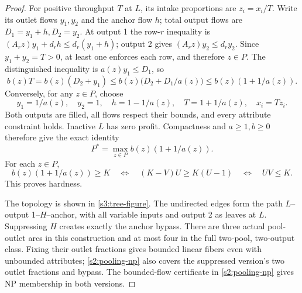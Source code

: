 \begin{proof}
For positive throughput $T$ at $L$, its intake proportions are $z_i=x_i/T$.
Write its outlet flows $y_1,y_2$ and the anchor flow $h$; total output
flows are $D_1=y_1+h,D_2=y_2$. At output 1 the row-$r$ inequality is
$(A_rz)y_1+d_rh\le d_r(y_1+h)$; output 2 gives
$(A_rz)y_2\le d_ry_2$. Since $y_1+y_2=T>0$, at least one enforces
each row, and therefore $z\in P$. The distinguished inequality is
$a(z)y_1\le D_1$, so
\[
 b(z)T=b(z)(D_2+y_1)
 \le b(z)\bigl(D_2+D_1/a(z)\bigr)
 \le b(z)(1+1/a(z)).
\]
Conversely, for any $z\in P$, choose
\begin{equation}
 y_1=1/a(z),\quad y_2=1,\quad h=1-1/a(z),\quad
 T=1+1/a(z),\quad x_i=Tz_i.\label{s3:radial-max}
\end{equation}
Both outputs are filled, all flows respect their bounds, and every
attribute constraint holds. Inactive $L$ has zero profit. Compactness
and $a\ge1,b\ge0$ therefore give the exact identity
\begin{equation}
 P^*=\max_{z\in P}b(z)(1+1/a(z)).\label{s3:two-pool-value}
\end{equation}
For each $z\in P$,
\begin{equation}
 b(z)(1+1/a(z))\ge K
 \quad\Longleftrightarrow\quad
 (K-V)U\ge K(U-1)
 \quad\Longleftrightarrow\quad UV\le K.\label{s3:threshold-product}
\end{equation}
This proves hardness.

The topology is shown in \cref{s3:tree-figure}. The undirected edges form
the path $L$--output 1--$H$--anchor, with all variable inputs and output 2
as leaves at $L$. Suppressing $H$ creates exactly the anchor bypass.
There are three actual pool-outlet arcs in this construction and at
most four in the full two-pool, two-output class. Fixing their outlet
fractions gives bounded linear fibers even with unbounded attributes;
\cref{s2:pooling-np} also covers the suppressed version's two outlet
fractions and bypass. The bounded-flow
certificate in \cref{s2:pooling-np} gives NP membership in both versions.
\end{proof}

